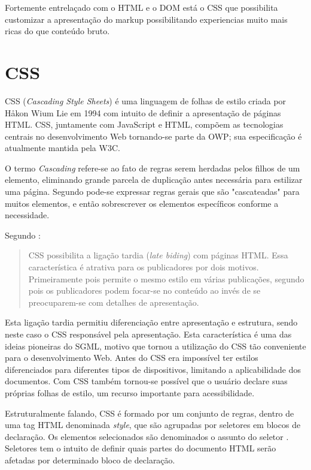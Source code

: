 Fortemente entrelaçado com o HTML e o DOM está o CSS que possibilita
customizar a apresentação do markup possibilitando experiencias muito
mais ricas do que conteúdo bruto.
\section{CSS}
CSS (\textit{Cascading Style Sheets}) é uma linguagem de folhas de
estilo criada por Håkon Wium Lie em 1994 com intuito de definir a
apresentação de páginas HTML. CSS, juntamente com JavaScript e HTML,
compõem as tecnologias centrais no desenvolvimento Web tornando-se
parte da OWP; sua especificação é atualmente mantida pela W3C.

O termo \textit{Cascading} refere-se ao fato de regras serem
herdadas pelos filhos de um elemento, eliminando grande parcela de
duplicação antes necessária para estilizar uma página. Segundo
\citet{html5mostwanted} pode-se expressar regras gerais que são
"cascateadas" para muitos elementos, e então sobrescrever os elementos
específicos conforme a necessidade.

Segundo \citet[p. 23--24]{CascadingStyleSheets}:
\begin{quote}
CSS possibilita a ligação tardia (\textit{late biding}) com
páginas HTML. Essa característica é atrativa para os publicadores
por dois motivos. Primeiramente pois permite o mesmo estilo em várias
publicações, segundo pois os publicadores podem focar-se no conteúdo
ao invés de se preocuparem-se com detalhes de apresentação.
\end{quote}

Esta ligação tardia permitiu diferenciação entre apresentação e
estrutura, sendo neste caso o CSS responsável pela apresentação. Esta
característica é uma das ideias pioneiras do SGML, motivo que tornou a
utilização do CSS tão conveniente para o desenvolvimento Web.
Antes do CSS era impossível ter estilos diferenciados para diferentes
tipos de dispositivos, limitando a aplicabilidade dos documentos.
Com CSS também tornou-se possível que o usuário declare suas próprias
folhas de estilo, um recurso importante para acessibilidade.

Estruturalmente falando, CSS é formado por um conjunto de regras,
dentro de uma tag HTML denominada \textit{style}, que são agrupadas
por seletores em blocos de declaração. Os elementos selecionados são
denominados o assunto do seletor \autocite{cssSelectors}. Seletores tem
o intuito de definir quais partes do documento HTML serão afetadas por
determinado bloco de declaração.

